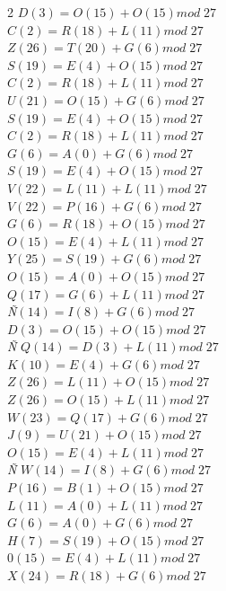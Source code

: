\documentclass{article}
\begin{document}
\begin{enumerate}
\begin{multicols}{2}
$D (3) = O(15) + O (15) mod \; 27$ \\
$C (2) = R(18) + L (11) mod \; 27$ \\
$Z (26) = T(20) + G (6) mod \; 27$ \\
$S (19) = E(4) + O (15) mod \; 27$ \\
$C (2) = R(18) + L (11) mod \; 27$ \\
$U (21) = O(15) + G (6) mod \; 27$ \\
$S (19) = E(4) + O (15) mod \; 27$ \\
$C (2) = R(18) + L (11) mod \; 27$ \\
$G (6) = A(0) + G (6) mod \; 27$ \\
$S (19) = E(4) + O (15) mod \; 27$ \\
$V (22) = L(11) + L (11) mod \; 27$ \\
$V (22) = P(16) + G (6) mod \; 27$ \\
$G (6) = R(18) + O (15) mod \; 27$ \\
$O (15) = E(4) + L (11) mod \; 27$ \\
$Y (25) = S(19) + G (6) mod \; 27$ \\
$O (15) = A(0) + O (15) mod \; 27$ \\
$Q (17) = G(6) + L (11) mod \; 27$ \\
\textit{Ñ}$ (14) = I(8) + G (6) mod \; 27$ \\
$D (3) = O(15) + O (15) mod \; 27$ \\
\textit{Ñ} $Q (14) = D(3) + L (11) mod \; 27$ \\
$K (10) = E(4) + G (6) mod \; 27$ \\
$Z (26) = L(11) + O (15) mod \; 27$ \\
$Z (26) = O(15) + L (11) mod \; 27$ \\
$W (23) = Q(17) + G (6) mod \; 27$ \\
$J (9) = U(21) + O (15) mod \; 27$ \\
$O (15) = E(4) + L (11) mod \; 27$ \\
\textit{Ñ} $W (14) = I(8) + G (6) mod \; 27$ \\
$P (16) = B(1) + O (15) mod \; 27$ \\
$L (11) = A(0) + L (11) mod \; 27$ \\
$G (6) = A(0) + G (6) mod \; 27$ \\
$H (7) = S(19) + O (15) mod \; 27$ \\
$0 (15) = E(4) + L (11) mod \; 27$ \\
$X (24) = R(18) + G (6) mod \; 27$ \\

\end{multicols}
\end{enumerate}
\end{document}
